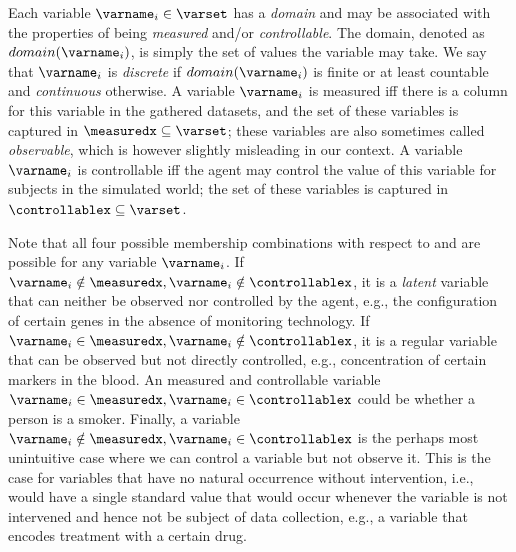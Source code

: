 \documentclass{uai2024} %
\begin{document}
        Each variable $\varname_i \in \varset$ has a \emph{domain} and may be associated with the properties of being \emph{measured} and/or \emph{controllable}.
        The domain, denoted as $domain(\varname_i)$, is simply the set of values the variable may take.
        We say that $\varname_i$ is \emph{discrete} if $domain(\varname_i)$ is finite or at least countable and \emph{continuous} otherwise.
        A variable $\varname_i$ is measured iff there is a column for this variable in the gathered datasets, and the set of these variables is captured in $\measuredx \subseteq \varset$; these variables are also sometimes called \emph{observable}, which is however slightly misleading in our context.
        A variable $\varname_i$ is controllable iff the agent may control the value of this variable for subjects in the simulated world; the set of these variables is captured in $\controllablex \subseteq \varset$.
        
        Note that all four possible membership combinations with respect to \measuredx and \controllablex are possible for any variable $\varname_i$.
        If $\varname_i \notin \measuredx, \varname_i \notin \controllablex$, it is a \emph{latent} variable that can neither be observed nor controlled by the agent, e.g., the configuration of certain genes in the absence of monitoring technology.
        If $\varname_i \in \measuredx, \varname_i \notin \controllablex$, it is a regular variable that can be observed but not directly controlled, e.g., concentration of certain markers in the blood.
        An measured and controllable variable $\varname_i \in \measuredx, \varname_i \in \controllablex$ could be whether a person is a smoker.
        Finally, a variable $\varname_i \notin \measuredx, \varname_i \in \controllablex$ is the perhaps most unintuitive case where we can control a variable but not observe it.
        This is the case for variables that have no natural occurrence without intervention, i.e., would have a single standard value that would occur whenever the variable is not intervened and hence not be subject of data collection, e.g., a variable that encodes treatment with a certain drug.
\end{document}
